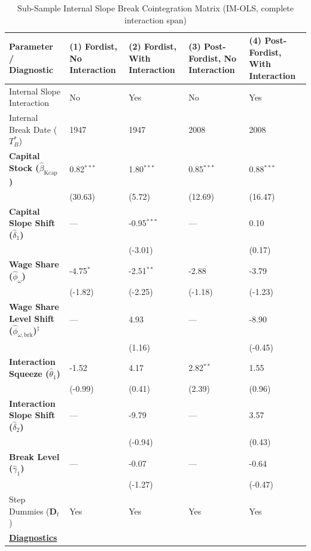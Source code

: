 \documentclass[11pt,a4paper]{article}
\begin{document}
\begin{table}[H]
\centering
\caption{Sub-Sample Internal Slope Break Cointegration Matrix (IM-OLS, complete interaction span)}
\label{tab:specA_table_X}
\small
\begin{tabular}{p{5.5cm}p{2.5cm}p{2.5cm}p{2.5cm}p{2.5cm}}
\toprule
Parameter / Diagnostic & (1) Fordist, No Interaction & (2) Fordist, With Interaction & (3) Post-Fordist, No Interaction & (4) Post-Fordist, With Interaction \\
\midrule
Internal Slope Interaction & No & Yes & No & Yes \\
Internal Break Date ($T_B^*$) & 1947 & 1947 & 2008 & 2008 \\
\midrule
\textbf{Capital Stock ($\hat{\beta}_{\text{Kcap}}$)} & 0.82$^{***}$ & 1.80$^{***}$ & 0.85$^{***}$ & 0.88$^{***}$ \\
 & {\scriptsize (30.63)} & {\scriptsize (5.72)} & {\scriptsize (12.69)} & {\scriptsize (16.47)} \\
\textbf{Capital Slope Shift ($\hat{\delta}_1$)} & --- & -0.95$^{***}$ & --- & 0.10 \\
 & & {\scriptsize (-3.01)} & & {\scriptsize (0.17)} \\
\textbf{Wage Share ($\hat{\phi}_{\omega}$)} & -4.75$^{*}$ & -2.51$^{**}$ & -2.88 & -3.79 \\
 & {\scriptsize (-1.82)} & {\scriptsize (-2.25)} & {\scriptsize (-1.18)} & {\scriptsize (-1.23)} \\
\textbf{Wage Share Level Shift ($\hat{\phi}_{\omega, \text{brk}}$)}$^{\ddagger}$ & --- & 4.93 & --- & -8.90 \\
 & & {\scriptsize (1.16)} & & {\scriptsize (-0.45)} \\
\textbf{Interaction Squeeze ($\hat{\theta}_1$)} & -1.52 & 4.17 & 2.82$^{**}$ & 1.55 \\
 & {\scriptsize (-0.99)} & {\scriptsize (0.41)} & {\scriptsize (2.39)} & {\scriptsize (0.96)} \\
\textbf{Interaction Slope Shift ($\hat{\delta}_2$)} & --- & -9.79 & --- & 3.57 \\
 & & {\scriptsize (-0.94)} & & {\scriptsize (0.43)} \\
\textbf{Break Level ($\hat{\gamma}_1$)} & --- & -0.07 & --- & -0.64 \\
 & & {\scriptsize (-1.27)} & & {\scriptsize (-0.47)} \\
Step Dummies ($\mathbf{D}_t$) & Yes & Yes & Yes & Yes \\
\midrule
\multicolumn{5}{l}{\underline{\textbf{Diagnostics}}} \\

\end{tabular}
\end{table}
\end{document}
